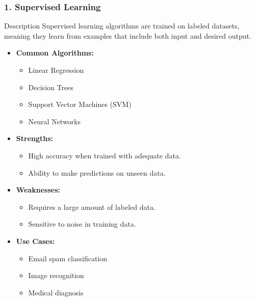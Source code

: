 \documentclass[aspectratio=169]{beamer}
\begin{document}
\begin{frame}[fragile]
    \frametitle{1. Supervised Learning}
    \begin{block}{Description}
        Supervised learning algorithms are trained on labeled datasets, meaning they learn from examples that include both input and desired output.
    \end{block}
    \begin{itemize}
        \item \textbf{Common Algorithms:}
            \begin{itemize}
                \item Linear Regression
                \item Decision Trees
                \item Support Vector Machines (SVM)
                \item Neural Networks
            \end{itemize}
        \item \textbf{Strengths:}
            \begin{itemize}
                \item High accuracy when trained with adequate data.
                \item Ability to make predictions on unseen data.
            \end{itemize}
        \item \textbf{Weaknesses:}
            \begin{itemize}
                \item Requires a large amount of labeled data.
                \item Sensitive to noise in training data.
            \end{itemize}
        \item \textbf{Use Cases:}
            \begin{itemize}
                \item Email spam classification
                \item Image recognition
                \item Medical diagnosis
            \end{itemize}
    \end{itemize}
\end{frame}
\end{document}

